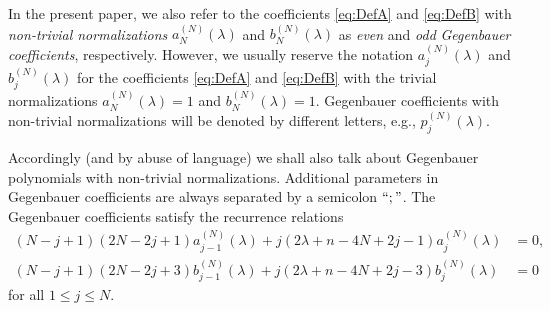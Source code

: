 \documentclass[a4paper,12pt,reqno]{amsart}
\numberwithin{theorem}{subsection}
\numberwithin{equation}{section}
\begin{document}
In the present paper, we also refer to the coefficients \eqref{eq:DefA} and
\eqref{eq:DefB} with {\em non-trivial normalizations} $a_N^{(N)}(\lambda)$ and
$b_N^{(N)}(\lambda)$ as {\em even} and {\em odd} {\em Gegenbauer coefficients},
respectively. However, we usually reserve the notation $a_j^{(N)}(\lambda)$ and
$b_j^{(N)}(\lambda)$ for the coefficients \eqref{eq:DefA} and \eqref{eq:DefB}
with the trivial normalizations $a_N^{(N)}(\lambda)=1$ and
$b_N^{(N)}(\lambda)=1$. Gegenbauer coefficients with non-trivial normalizations
will be denoted by different letters, e.g., $p_j^{(N)}(\lambda)$.

Accordingly (and by abuse of language) we shall also talk about Gegenbauer
polynomials with non-trivial normalizations. Additional parameters in
Gegenbauer coefficients are always separated by a semicolon $``;"$. The
Gegenbauer coefficients satisfy the recurrence relations
\begin{align}
   (N\!-\!j\!+\!1)(2N\!-\!2j\!+\!1) a^{(N)}_{j-1}(\lambda) +
   j(2\lambda\!+\!n\!-\!4N\!+\!2j\!-\!1) a^{(N)}_j(\lambda) & = 0, \label{Gegen-rec1} \\
   (N\!-\!j\!+\!1)(2N\!-\!2j\!+\!3) b^{(N)}_{j-1}(\lambda) +
   j(2\lambda\!+\!n\!-\!4N\!+\!2j\!-\!3) b^{(N)}_j(\lambda) & = 0 \label{Gegen-rec2}
\end{align}
for all $1 \le j \le N$.
\end{document}
